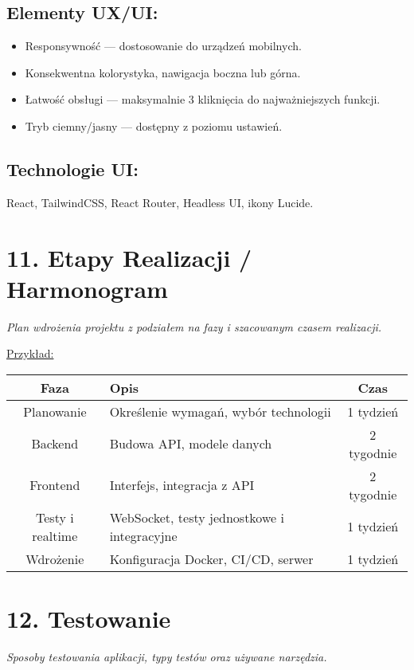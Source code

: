 \documentclass[a4paper,12pt]{article}
\begin{document}
\subsection*{Elementy UX/UI:}
\begin{itemize}
    \item Responsywność — dostosowanie do urządzeń mobilnych.
    \item Konsekwentna kolorystyka, nawigacja boczna lub górna.
    \item Łatwość obsługi — maksymalnie 3 kliknięcia do najważniejszych funkcji.
    \item Tryb ciemny/jasny — dostępny z poziomu ustawień.
\end{itemize}

\subsection*{Technologie UI:}
React, TailwindCSS, React Router, Headless UI, ikony Lucide.

\section*{11. Etapy Realizacji / Harmonogram}
\textit{Plan wdrożenia projektu z podziałem na fazy i szacowanym czasem realizacji.}

\vspace{0.5 cm}
 \noindent
\underline{Przykład:} 
\begin{longtable}{|c|p{8cm}|c|}
\hline
\textbf{Faza} & \textbf{Opis} & \textbf{Czas} \\
\hline
Planowanie & Określenie wymagań, wybór technologii & 1 tydzień \\
\hline
Backend & Budowa API, modele danych & 2 tygodnie \\
\hline
Frontend & Interfejs, integracja z API & 2 tygodnie \\
\hline
Testy i realtime & WebSocket, testy jednostkowe i integracyjne & 1 tydzień \\
\hline
Wdrożenie & Konfiguracja Docker, CI/CD, serwer & 1 tydzień \\
\hline
\end{longtable}

\section*{12. Testowanie}
\textit{Sposoby testowania aplikacji, typy testów oraz używane narzędzia.}
\end{document}
